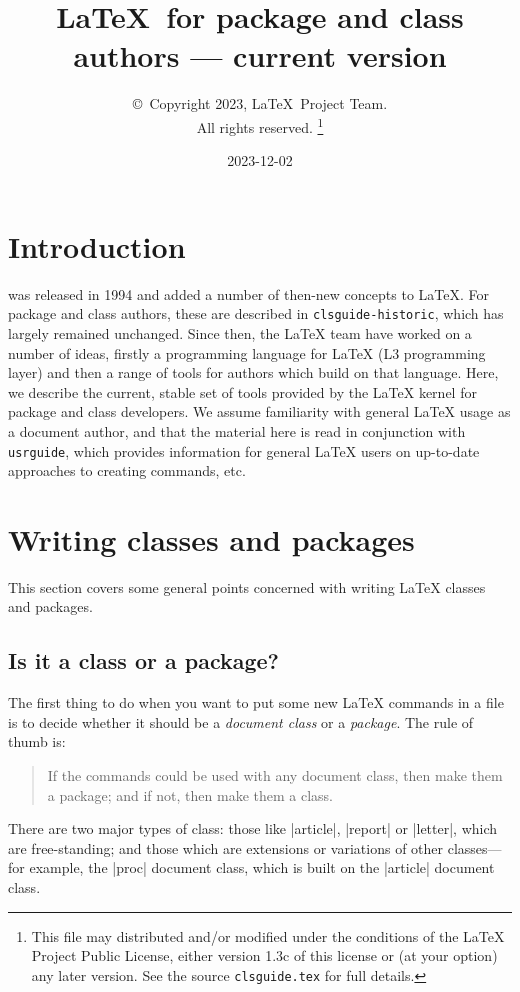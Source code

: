 \documentclass{ltxguide}
\title{\LaTeX\ for package and class authors --- current version}
\author{\copyright~Copyright 2023, \LaTeX\ Project Team.\\
   All rights reserved.%
   \footnote{This file may distributed and/or modified under the
     conditions of the \LaTeX{} Project Public License, either version 1.3c
     of this license or (at your option) any later version. See the source
    \texttt{clsguide.tex} for full details.}%
}
\date{2023-12-02}
\begin{document}
\maketitle

\tableofcontents

\section{Introduction}

\LaTeXe{} was released in 1994 and added a number of then-new concepts to
\LaTeX{}. For package and class authors, these are described in
\texttt{clsguide-historic}, which has largely remained unchanged. Since then,
the \LaTeX{} team have worked on a number of ideas, firstly a programming
language for \LaTeX{} (L3 programming layer) and then a range of tools for
authors which build on that language. Here, we describe the current, stable set
of tools provided by the \LaTeX{} kernel for package and class developers. We
assume familiarity with general \LaTeX{} usage as a document author, and that
the material here is read in conjunction with \texttt{usrguide}, which provides
information for general \LaTeX{} users on up-to-date approaches to creating
commands, etc.

\section{Writing classes and packages}
\label{Sec:writing}

This section covers some general points concerned with writing
\LaTeX{} classes and packages.

\subsection{Is it a class or a package?}
\label{Sec:classorpkg}

The first thing to do when you want to put some new \LaTeX{} commands
in a file is to decide whether it should be a \emph{document class} or a
\emph{package}.  The rule of thumb is:
\begin{quote}
  If the commands could be used with any document class, then make
  them a package; and if not, then make them a class.
\end{quote}

There are two major types of class: those like |article|, |report| or
|letter|, which are free-standing; and those which are extensions or
variations of other classes---for example, the |proc| document class,
which is built on the |article| document class.
\end{document}
